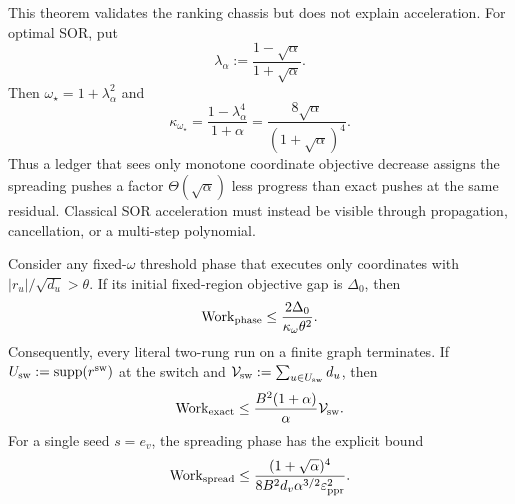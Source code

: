 This theorem validates the ranking chassis but does not explain acceleration.
For optimal SOR, put
\begin{equation}
 \lambda_\alpha:=\frac{1-\sqrt\alpha}{1+\sqrt\alpha}.
 \label{eq:direct-lambda}
\end{equation}
Then $\omega_\star=1+\lambda_\alpha^2$ and
\begin{equation}
 \kappa_{\omega_\star}
 =\frac{1-\lambda_\alpha^4}{1+\alpha}
 =\frac{8\sqrt\alpha}{(1+\sqrt\alpha)^4}.
 \label{eq:direct-optimal-objective-factor}
\end{equation}
Thus a ledger that sees only monotone coordinate objective decrease assigns
the spreading pushes a factor $\Theta(\sqrt\alpha)$ less progress than exact
pushes at the same residual. Classical SOR acceleration must instead be
visible through propagation, cancellation, or a multi-step polynomial.

\begin{proposition}
\label{prop:direct-fallback}
Consider any fixed-$\omega$ threshold phase that executes only coordinates
with $|r_u|/\sqrt{d_u}>\theta$. If its initial fixed-region objective gap is
$\Delta_0$, then
\begin{equation}
 \operatorname{Work}_{\rm phase}
 \leq\frac{2\Delta_0}{\kappa_\omega\theta^2}.
 \label{eq:direct-phase-fallback}
\end{equation}
Consequently, every literal two-rung run on a finite graph terminates. If
$U_{\rm sw}:=\operatorname{supp}(r^{\rm sw})$ at the switch and
$\mathcal V_{\rm sw}:=\sum_{u\in U_{\rm sw}}d_u$, then
\begin{equation}
 \operatorname{Work}_{\rm exact}
 \leq\frac{B^2(1+\alpha)}{\alpha}\mathcal V_{\rm sw}.
 \label{eq:direct-exact-fallback}
\end{equation}
For a single seed $s=e_v$, the spreading phase has the explicit bound
\begin{equation}
 \operatorname{Work}_{\rm spread}
 \leq
 \frac{(1+\sqrt\alpha)^4}
      {8B^2d_v\alpha^{3/2}\varepsilon_{\mathrm{ppr}}^2}.
 \label{eq:direct-spread-fallback}
\end{equation}
\end{proposition}

